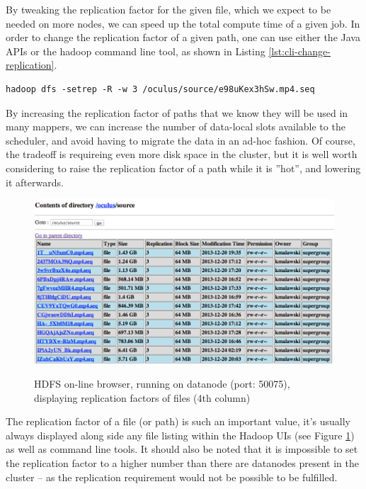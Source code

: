 By tweaking the replication factor for the given file, which we expect to be needed on more nodes, we can speed up the total compute time of a given job. In order to change the replication factor of a given path, one can use either the Java APIs or the hadoop command line tool, as shown in Listing \ref{lst:cli-change-replication}.

\begin{lstlisting}[caption={Explicitly changing the replication factor on a path using command line tools}, label={lst:cli-change-replication}]
hadoop dfs -setrep -R -w 3 /oculus/source/e98uKex3hSw.mp4.seq
\end{lstlisting}

By increasing the replication factor of paths that we know they will be used in many mappers, we can increase the number of data-local slots available to the scheduler, and avoid having to migrate the data in an ad-hoc fashion. Of course, the tradeoff is requireing even more disk space in the cluster, but it is well worth considering to raise the replication factor of a path while it is ''hot'', and lowering it afterwards.

\begin{figure}
  \centering
  \includegraphics[width=\textwidth]{img/hadoop/hdfs_show-replication}
  \label{fig:hdfs-replication-factors}
  \caption{HDFS on-line browser, running on datanode (port: 50075), displaying replication factors of files (4th column)}
\end{figure}

The replication factor of a file (or path) is such an important value, it's usually always displayed along side any file listing within the Hadoop UIs (see Figure \ref{fig:hdfs-replication-factors}) as well as command line tools. It should also be noted that it is impossible to set the replication factor to a higher number than there are datanodes present in the cluster -- as the replication requirement would not be possible to be fulfilled.


